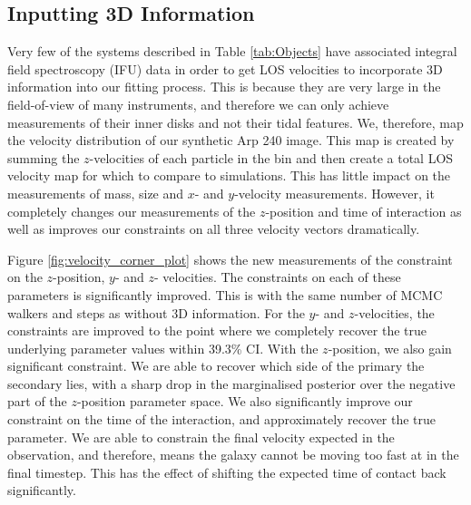 \subsection{Inputting 3D Information}
Very few of the systems described in Table \ref{tab:Objects} have associated integral field spectroscopy (IFU) data in order to get LOS velocities to incorporate 3D information into our fitting process. This is because they are very large in the field-of-view of many instruments, and therefore we can only achieve measurements of their inner disks and not their tidal features. We, therefore, map the velocity distribution of our synthetic Arp 240 image. This map is created by summing the $z$-velocities of each particle in the bin and then create a total LOS velocity map for which to compare to simulations. This has little impact on the measurements of mass, size and $x$- and $y$-velocity measurements. However, it completely changes our measurements of the $z$-position and time of interaction as well as improves our constraints on all three velocity vectors dramatically. 

Figure \ref{fig:velocity_corner_plot} shows the new measurements of the constraint on the $z$-position, $y$- and $z$- velocities. The constraints on each of these parameters is significantly improved. This is with the same number of MCMC walkers and steps as without 3D information. For the $y$- and $z$-velocities, the constraints are improved to the point where we completely recover the true underlying parameter values within 39.3\% CI. With the $z$-position, we also gain significant constraint. We are able to recover which side of the primary the secondary lies, with a sharp drop in the marginalised posterior over the negative part of the $z$-position parameter space. We also significantly improve our constraint on the time of the interaction, and approximately recover the true parameter. We are able to constrain the final velocity expected in the observation, and therefore, means the galaxy cannot be moving too fast at in the final timestep. This has the effect of shifting the expected time of contact back significantly.

